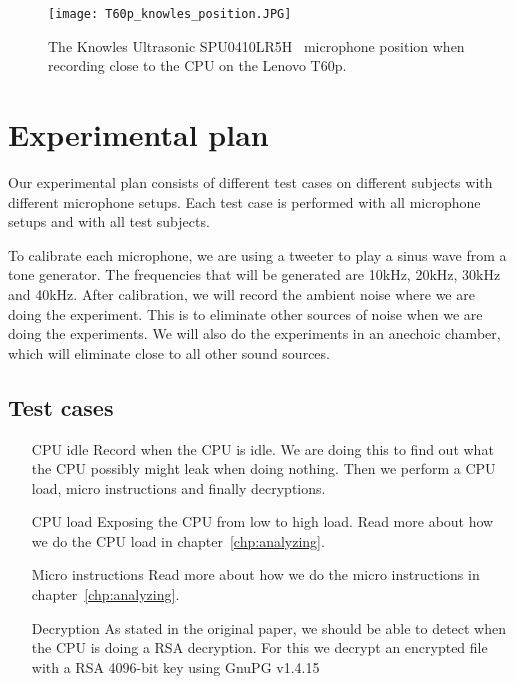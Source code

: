 \begin{wrapfigure}{r}{0.5\textwidth}
    \vspace{-20pt}
    \centering
    \texttt{[image: T60p\_knowles\_position.JPG]}
    \vspace{-20pt}
    \caption{The Knowles Ultrasonic SPU0410LR5H~\cite{knowles_spec} microphone position when recording close to the CPU on the Lenovo T60p.}
    \vspace{-20pt}
    \label{fig:T60p_knowles_position}
\end{wrapfigure}


\section{Experimental plan}\label{sec:ch3_experimental_plan}

Our experimental plan consists of different test cases on different subjects with different microphone setups. 
Each test case is performed with all microphone setups and with all test subjects. 

To calibrate each microphone, we are using a tweeter to play a sinus wave from a tone generator. 
The frequencies that will be generated are 10kHz, 20kHz, 30kHz and 40kHz.
After calibration, we will record the ambient noise where we are doing the experiment.
This is to eliminate other sources of noise when we are doing the experiments.
We will also do the experiments in an anechoic chamber, which will eliminate close to all other sound sources.

\subsection{Test cases}


\begin{enumerate}
  \item[CPU idle] Record when the CPU is idle. 
  We are doing this to find out what the CPU possibly might leak when doing nothing. 
  Then we perform a CPU load, micro instructions and finally decryptions.
  \item[CPU load] Exposing the CPU from low to high load.
  Read more about how we do the CPU load in chapter~\ref{chp:analyzing}.
  \item[Micro instructions] Read more about how we do the micro instructions in chapter~\ref{chp:analyzing}.
  \item[Decryption] As stated in the original paper, we should be able to detect when the CPU is doing a RSA decryption. 
  For this we decrypt an encrypted file with a RSA 4096-bit key using GnuPG v1.4.15~\cite{GnuPG_1.4.15}
\end{enumerate}

